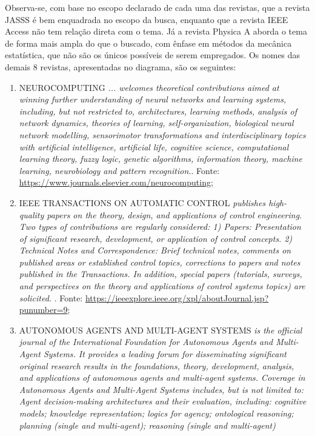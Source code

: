 Observa-se, com base no escopo declarado de cada uma das revistas, que a revista JASSS é bem enquadrada no escopo da busca, enquanto que a revista IEEE Access não tem relação direta com o tema. Já a revista Physica A aborda o tema de forma mais ampla do que o buscado, com ênfase em métodos da mecânica estatística, que não são os únicos possíveis de serem empregados.
Os nomes das demais 8 revistas, apresentadas no diagrama, são os seguintes:
\begin{enumerate}
    \item NEUROCOMPUTING \textit{\small  ... welcomes theoretical contributions aimed at winning further understanding of neural networks and learning systems, including, but not restricted to, architectures, learning methods, analysis of network dynamics, theories of learning, self-organization, biological neural network modelling, sensorimotor transformations and interdisciplinary topics with artificial intelligence, artificial life, cognitive science, computational learning theory, fuzzy logic, genetic algorithms, information theory, machine learning, neurobiology and pattern recognition.}. Fonte: \url{https://www.journals.elsevier.com/neurocomputing};
    \item IEEE TRANSACTIONS ON AUTOMATIC CONTROL \textit{\small publishes high-quality papers on the theory, design, and applications of control engineering.  Two types of contributions are regularly considered: 
1) Papers:  Presentation of significant research, development, or application of control concepts. 
2) Technical Notes and Correspondence:  Brief technical notes, comments on published areas or established control topics, corrections to papers and notes published in the Transactions.
In addition, special papers (tutorials, surveys, and perspectives on the theory and applications of control systems topics) are solicited. }. Fonte: \url{https://ieeexplore.ieee.org/xpl/aboutJournal.jsp?punumber=9};
    \item AUTONOMOUS AGENTS AND MULTI-AGENT SYSTEMS \textit{\small is the official journal of the International Foundation for Autonomous Agents and Multi-Agent Systems. It provides a leading forum for disseminating significant original research results in the foundations, theory, development, analysis, and applications of autonomous agents and multi-agent systems. Coverage in Autonomous Agents and Multi-Agent Systems includes, but is not limited to:
Agent decision-making architectures and their evaluation, including: cognitive models; knowledge representation; logics for agency; ontological reasoning; planning (single and multi-agent); reasoning (single and multi-agent)
}
\end{enumerate}
